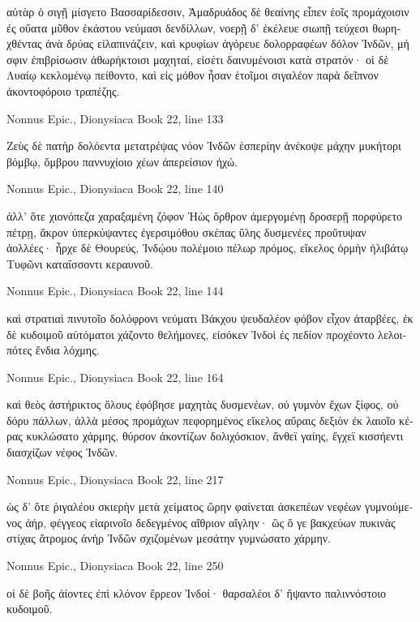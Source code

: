 \documentclass[12pt,letterpaper,twoside,final]{memoir}
\begin{document}
\begin{greek}
                                  αὐτὰρ ὁ σιγῇ 
μίσγετο Βασσαρίδεσσιν, Ἁμαδρυάδος δὲ θεαίνης 
εἶπεν ἑοῖς προμάχοισιν ἐς οὔατα μῦθον ἑκάστου 
νεύμασι δενδίλλων, νοερῇ δ' ἐκέλευε σιωπῇ 
τεύχεσι θωρηχθέντας ἀνὰ δρύας εἰλαπινάζειν, 
καὶ κρυφίων ἀγόρευε δολορραφέων δόλον Ἰνδῶν, 
μή σφιν ἐπιβρίσωσιν ἀθωρήκτοισι μαχηταί, 
εἰσέτι δαινυμένοισι κατὰ στρατόν· οἱ δὲ Λυαίῳ 
κεκλομένῳ πείθοντο, καὶ εἰς μόθον ἦσαν ἑτοῖμοι 
σιγαλέον παρὰ δεῖπνον ἀκοντοφόροιο τραπέζης. 



Nonnus Epic., Dionysiaca 
Book 22, line 133

Ζεὺς δὲ πατὴρ δολόεντα μετατρέψας νόον Ἰνδῶν 
ἑσπερίην ἀνέκοψε μάχην μυκήτορι βόμβῳ, 
ὄμβρου παννυχίοιο χέων ἀπερείσιον ἠχώ. 



Nonnus Epic., Dionysiaca 
Book 22, line 140

ἀλλ' ὅτε χιονόπεζα χαραξαμένη ζόφον Ἠὼς 
ὄρθρον ἀμεργομένῃ δροσερῇ πορφύρετο πέτρῃ, 
ἄκρον ὑπερκύψαντες ἐγερσιμόθου σκέπας ὕλης 
δυσμενέες προὔτυψαν ἀολλέες· ἦρχε δὲ Θουρεύς, 
Ἰνδῴου πολέμοιο πέλωρ πρόμος, εἴκελος ὁρμὴν 
ἠλιβάτῳ Τυφῶνι καταΐσσοντι κεραυνοῦ. 



Nonnus Epic., Dionysiaca 
Book 22, line 144

καὶ στρατιαὶ πινυτοῖο δολόφρονι νεύματι Βάκχου 
ψευδαλέον φόβον εἶχον ἀταρβέες, ἐκ δὲ κυδοιμοῦ 
αὐτόματοι χάζοντο θελήμονες, εἰσόκεν Ἰνδοὶ 
ἐς πεδίον προχέοντο λελοιπότες ἔνδια λόχμης. 



Nonnus Epic., Dionysiaca 
Book 22, line 164

καὶ θεὸς ἀστήρικτος ὅλους ἐφόβησε μαχητὰς 
δυσμενέων, οὐ γυμνὸν ἔχων ξίφος, οὐ δόρυ πάλλων, 
ἀλλὰ μέσος προμάχων πεφορημένος εἴκελος αὔραις 
δεξιὸν ἐκ λαιοῖο κέρας κυκλώσατο χάρμης, 
θύρσον ἀκοντίζων δολιχόσκιον, ἄνθεϊ γαίης, 
ἔγχεϊ κισσήεντι διασχίζων νέφος Ἰνδῶν. 



Nonnus Epic., Dionysiaca 
Book 22, line 217

ὡς δ' ὅτε ῥιγαλέου σκιερὴν μετὰ χείματος ὥρην 
φαίνεται ἀσκεπέων νεφέων γυμνούμενος ἀήρ, 
φέγγεος εἰαρινοῖο δεδεγμένος αἴθριον αἴγλην·   
ὣς ὅ γε βακχεύων πυκινὰς στίχας ἄτρομος ἀνὴρ 
Ἰνδῶν σχιζομένων μεσάτην γυμνώσατο χάρμην. 



Nonnus Epic., Dionysiaca 
Book 22, line 250

οἱ δὲ βοῆς ἀίοντες ἐπὶ κλόνον ἔρρεον Ἰνδοί· 
θαρσαλέοι δ' ἥψαντο παλιννόστοιο κυδοιμοῦ. 




\end{greek}
\end{document}
